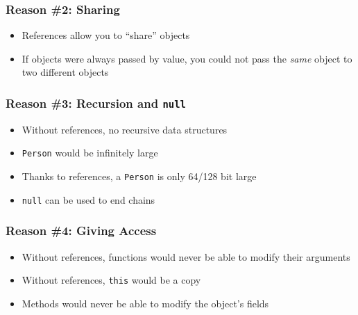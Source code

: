 \begin{frame}
  \frametitle{Reason \#2: Sharing}
  \begin{itemize}
    \item References allow you to ``share'' objects
    \item If objects were always passed by value, you could not pass the \emph{same} object to two different objects
  \end{itemize}

  \begin{center}
  \end{center}
\end{frame}

\begin{frame}
  \frametitle{Reason \#3: Recursion and \texttt{null}}
  \begin{itemize}
    \item Without references, no recursive data structures
    \item \texttt{Person} would be infinitely large
    \item Thanks to references, a \texttt{Person} is only 64/128 bit large
    \item \texttt{null} can be used to end chains
  \end{itemize}
\end{frame}

\begin{frame}
  \frametitle{Reason \#4: Giving Access}
  \begin{itemize}
    \item Without references, functions would never be able to modify their arguments
    \item Without references, \texttt{this} would be a copy
    \item Methods would never be able to modify the object's fields
  \end{itemize}
\end{frame}

